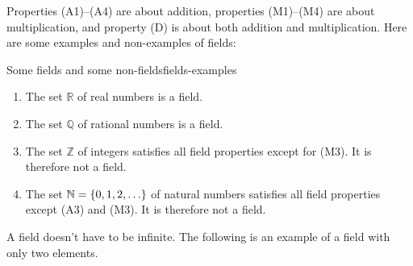 Properties (A1)--(A4) are about addition, properties (M1)--(M4) are
about multiplication, and property (D) is about both addition and
multiplication. Here are some examples and non-examples of fields:

\begin{example}{Some fields and some non-fields}{fields-examples}
  \begin{enumialphparenastyle}
    \begin{enumerate}
    \item The set $\mathbb{R}$ of real numbers is a field.
    \item The set $\mathbb{Q}$ of rational numbers is a field.
    \item The set $\mathbb{Z}$ of integers satisfies all field
      properties except for (M3). It is therefore not a field.
    \item The set $\mathbb{N}=\{0,1,2,\ldots\}$ of natural numbers
      satisfies all field properties except (A3) and (M3). It is
      therefore not a field.
    \end{enumerate}
  \end{enumialphparenastyle}
\end{example}

A field doesn't have to be infinite. The following is an example of a
field with only two elements.

